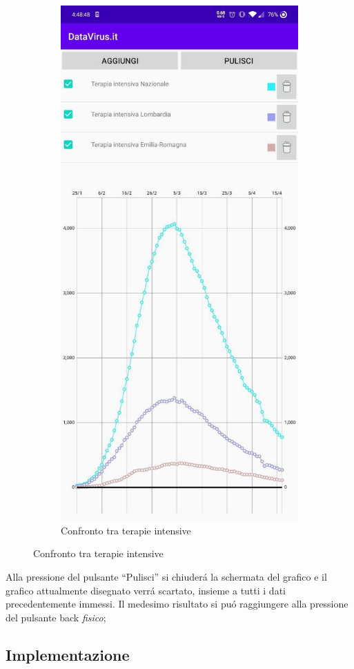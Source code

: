 \documentclass{article}
\newcommand{\quotes}[1]{``#1''}
\begin{document}
\begin{figure}[h]
\begin{subfigure}{.5\textwidth}
        \includegraphics[width=.7\linewidth]{chart_ICU.jpg}
        \caption{Confronto tra terapie intensive}
        \label{fig5:sub2}
      \end{subfigure}
    \end{figure}
    Alla pressione del pulsante \quotes{Pulisci} si chiuderá la schermata del grafico e il grafico attualmente disegnato verrá scartato, insieme a tutti i dati precedentemente immessi.
    Il medesimo risultato si puó raggiungere alla pressione del pulsante back \emph{fisico};

    \subsection{Implementazione}
\end{document}
